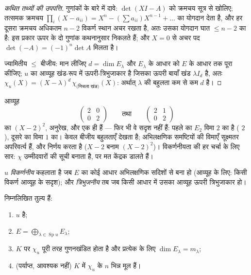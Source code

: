 \begin{proof}[कथित तथ्यों की उपपत्ति]
गुणांकों के बारे में दावे: $\det(XI - A)$ को क्रमचय सूत्र से खोलिए; तत्समक क्रमचय
$\prod_i (X - a_{ii})
= X^n - (\sum a_{ii})X^{n-1} + \dots$ का योगदान देता है, और हर दूसरा क्रमचय अधिकतम $n - 2$ विकर्ण स्थान अचर
रखता है, अतः उसका योगदान घात $\leq
n - 2$ का है: इस प्रकार ऊपर के दो गुणांक
कथनानुसार निकलते हैं; और $X = 0$ से अचर पद $\det(-A) = (-1)^n\det A$ मिलता है।

ज्यामितीय $\leq$ बीजीय: मान लीजिए $d = \dim E_\lambda$ और $E_\lambda$ के आधार को $E$ के आधार तक
पूरा कीजिए; $u$ का आव्यूह खंड-रूप में ऊपरी-त्रिभुजाकार है जिसका ऊपरी
बायाँ खंड $\lambda I_d$ है, अतः $\chi_u(X) =
(X - \lambda)^d\, \chi_{\text{(निचला खंड)}}(X)$: अर्थात् $\lambda$ की
बहुलता कम से कम $d$ है।
\end{proof}

\begin{example}[एक ही $\chi$, भिन्न ज्यामिति]\label{ex:b2:reduction:samechi}
आव्यूह
\[
\begin{pmatrix}2 & 0\\ 0 & 2\end{pmatrix}
\qquad\text{तथा}\qquad
\begin{pmatrix}2 & 1\\ 0 & 2\end{pmatrix}
\]
का  $(X - 2)^2$, अनुरेख,  और  एक ही हैं ---
फिर भी वे सदृश नहीं हैं: पहले का $E_2$ विमा $2$ का है (
$2$), दूसरे का विमा $1$ का।  केवल बीजीय बहुलताएँ देखता
है; अभिलक्षणिक समष्टियों की विमाएँ सूक्ष्मतर अपरिवर्त्य हैं, और
 निर्णय करता है ($X - 2$ बनाम $(X - 2)^2$)। विकर्णनीयता की हर चर्चा
के लिए सार: $\chi$ उम्मीदवारों की सूची बनाता है, पर मत केंद्रक डालते हैं।
\end{example}

\begin{definition}[विकर्णनीय, त्रिभुजनीय]\label{def:b2:reduction:diag}
$u$ \emph{विकर्णनीय} कहलाता है जब $E$ का कोई आधार
अभिलक्षणिक सदिशों से बना हो (आव्यूह के लिए: किसी विकर्ण आव्यूह के
सदृश); और \emph{त्रिभुजनीय} तब जब किसी आधार में उसका
आव्यूह ऊपरी त्रिभुजाकार हो।
\end{definition}

\begin{theorem}[विकर्णनीयता की कसौटियाँ]\label{thm:b2:reduction:diagcrit}
निम्नलिखित तुल्य हैं:
\begin{enumerate}
  \item $u$  है;
  \item $E = \bigoplus_{\lambda \in \operatorname{Sp} u} E_\lambda$;
  \item $K$ पर $\chi_u$ पूरी तरह गुणनखंडित होता है और प्रत्येक  के लिए $\dim E_\lambda = m_\lambda$;
  \item (पर्याप्त, आवश्यक नहीं) $K$ में $\chi_u$ के $n$ भिन्न मूल हैं।
\end{enumerate}
\end{theorem}

